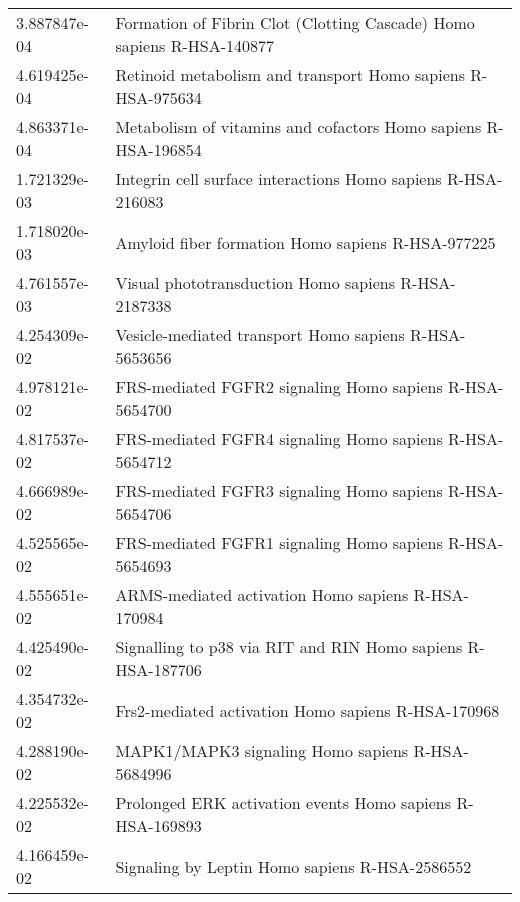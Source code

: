 \begin{longtable}{p{2.4cm}p{14.5cm}}
             3.887847e-04 &                Formation of Fibrin Clot (Clotting Cascade) Homo sapiens R-HSA-140877 \\
             4.619425e-04 &                          Retinoid metabolism and transport Homo sapiens R-HSA-975634 \\
             4.863371e-04 &                       Metabolism of vitamins and cofactors Homo sapiens R-HSA-196854 \\
             1.721329e-03 &                         Integrin cell surface interactions Homo sapiens R-HSA-216083 \\
             1.718020e-03 &                                    Amyloid fiber formation Homo sapiens R-HSA-977225 \\
             4.761557e-03 &                                  Visual phototransduction Homo sapiens R-HSA-2187338 \\
             4.254309e-02 &                                Vesicle-mediated transport Homo sapiens R-HSA-5653656 \\
             4.978121e-02 &                              FRS-mediated FGFR2 signaling Homo sapiens R-HSA-5654700 \\
             4.817537e-02 &                              FRS-mediated FGFR4 signaling Homo sapiens R-HSA-5654712 \\
             4.666989e-02 &                              FRS-mediated FGFR3 signaling Homo sapiens R-HSA-5654706 \\
             4.525565e-02 &                              FRS-mediated FGFR1 signaling Homo sapiens R-HSA-5654693 \\
             4.555651e-02 &                                   ARMS-mediated activation Homo sapiens R-HSA-170984 \\
             4.425490e-02 &                          Signalling to p38 via RIT and RIN Homo sapiens R-HSA-187706 \\
             4.354732e-02 &                                   Frs2-mediated activation Homo sapiens R-HSA-170968 \\
             4.288190e-02 &                                     MAPK1/MAPK3 signaling Homo sapiens R-HSA-5684996 \\
             4.225532e-02 &                            Prolonged ERK activation events Homo sapiens R-HSA-169893 \\
             4.166459e-02 &                                       Signaling by Leptin Homo sapiens R-HSA-2586552 \\

\end{longtable}
